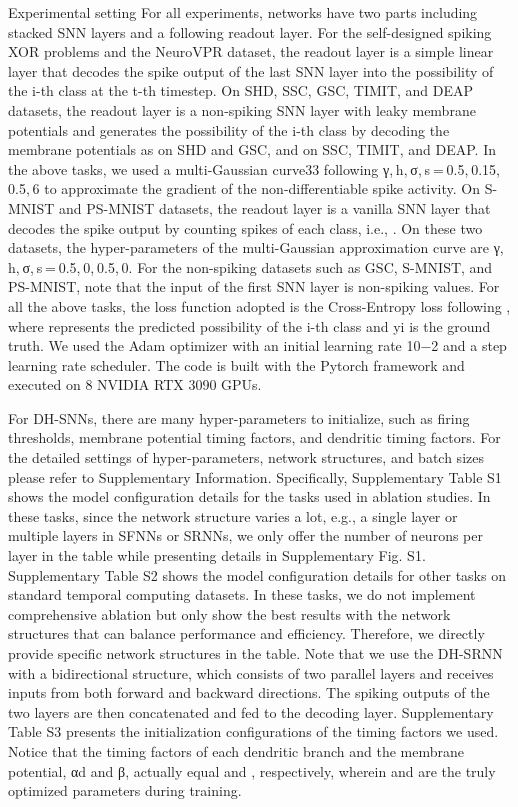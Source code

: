 Experimental setting
For all experiments, networks have two parts including stacked SNN layers and a following readout layer. For the self-designed spiking XOR problems and the NeuroVPR dataset, the readout layer is a simple linear layer that decodes the spike output of the last SNN layer into the possibility 
 of the i-th class at the t-th timestep. On SHD, SSC, GSC, TIMIT, and DEAP datasets, the readout layer is a non-spiking SNN layer with leaky membrane potentials and generates the possibility 
 of the i-th class by decoding the membrane potentials as 
 on SHD and GSC, and 
 on SSC, TIMIT, and DEAP. In the above tasks, we used a multi-Gaussian curve33 following γ, h, σ, s = 0.5, 0.15, 0.5, 6 to approximate the gradient of the non-differentiable spike activity. On S-MNIST and PS-MNIST datasets, the readout layer is a vanilla SNN layer that decodes the spike output by counting spikes of each class, i.e., 
. On these two datasets, the hyper-parameters of the multi-Gaussian approximation curve are γ, h, σ, s = 0.5, 0, 0.5, 0. For the non-spiking datasets such as GSC, S-MNIST, and PS-MNIST, note that the input of the first SNN layer is non-spiking values. For all the above tasks, the loss function adopted is the Cross-Entropy loss following 
, where 
 represents the predicted possibility of the i-th class and yi is the ground truth. We used the Adam optimizer with an initial learning rate 10−2 and a step learning rate scheduler. The code is built with the Pytorch framework and executed on 8 NVIDIA RTX 3090 GPUs.

For DH-SNNs, there are many hyper-parameters to initialize, such as firing thresholds, membrane potential timing factors, and dendritic timing factors. For the detailed settings of hyper-parameters, network structures, and batch sizes please refer to Supplementary Information. Specifically, Supplementary Table S1 shows the model configuration details for the tasks used in ablation studies. In these tasks, since the network structure varies a lot, e.g., a single layer or multiple layers in SFNNs or SRNNs, we only offer the number of neurons per layer in the table while presenting details in Supplementary Fig. S1. Supplementary Table S2 shows the model configuration details for other tasks on standard temporal computing datasets. In these tasks, we do not implement comprehensive ablation but only show the best results with the network structures that can balance performance and efficiency. Therefore, we directly provide specific network structures in the table. Note that we use the DH-SRNN with a bidirectional structure, which consists of two parallel layers and receives inputs from both forward and backward directions. The spiking outputs of the two layers are then concatenated and fed to the decoding layer. Supplementary Table S3 presents the initialization configurations of the timing factors we used. Notice that the timing factors of each dendritic branch and the membrane potential, αd and β, actually equal 
 and 
, respectively, wherein 
 and 
 are the truly optimized parameters during training.

